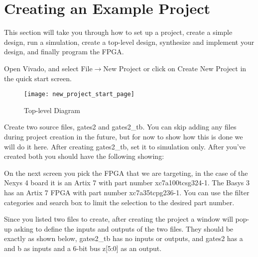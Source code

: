 \section{Creating an Example Project}
\label{sec:example_project}

This section will take you through how to set up a project, create a simple design, run a
simulation, create a top-level design, synthesize and implement your design, and finally
program the FPGA.

Open Vivado, and select File$\rightarrow$New Project or click on Create New Project in the
quick start screen.

\begin{figure}[!t]
\centering
\texttt{[image: new\_project\_start\_page]}
\caption{Top-level Diagram}
\end{figure}

Create two source files, gates2 and gates2\_tb.
You can skip adding any files during project creation in the future, but for now to show how
this is done we will do it here.
After creating gates2\_tb, set it to simulation only.
After you've created both you should have the following showing:


On the next screen you pick the FPGA that we are targeting, in the case of the Nexys 4 board it is
an Artix 7 with part number xc7a100tcsg324-1.
The Basys 3 has an Artix 7 FPGA with part number xc7a35tcpg236-1.
You can use the filter categories and search box to limit the selection to the desired part number.


Since you listed two files to create, after creating the project a window will pop-up asking to
define the inputs and outputs of the two files.
They should be exactly as shown below, gates2\_tb has no inputs or outputs, and gates2 has a and b
as inputs and a 6-bit bus z[5:0] as an output.

